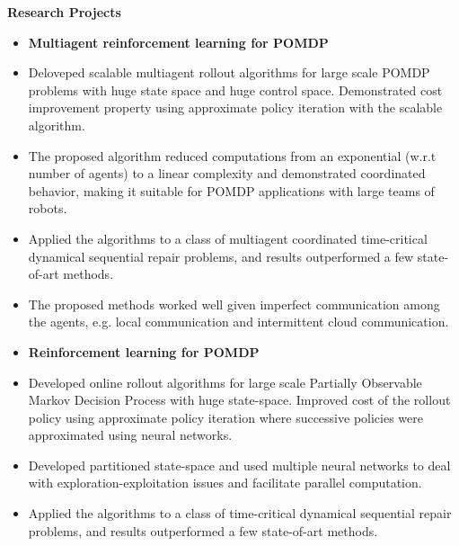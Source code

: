 \documentclass[a4paper,11pt]{article}
\newcommand{\resheading}[1]{{\small \colorbox{mygrey}{\begin{minipage}{0.975\textwidth}{\textbf{#1 \vphantom{p\^{E}}}}\end{minipage}}}}
\begin{document}
	
	
	
	
	
	
	\resheading{\textbf{\large Research Projects}}
	\begin{description}
		\item 
		\begin{itemize}
			\item\textbf{Multiagent reinforcement learning for POMDP}\hfill %
			\item Deloveped scalable multiagent rollout algorithms for large scale POMDP problems with huge state space and huge control space. Demonstrated cost improvement property using approximate policy iteration with the scalable algorithm.
			\item The proposed algorithm reduced computations from an exponential (w.r.t number of agents) to a linear complexity and demonstrated coordinated behavior, making it suitable for POMDP applications with large teams of robots.
			\item Applied the algorithms to a class of multiagent coordinated time-critical dynamical sequential repair problems, and results outperformed a few state-of-art methods.
			\item The proposed methods worked well given imperfect communication among the agents, e.g. local communication and intermittent cloud communication.
		\end{itemize}
		\item 
		\begin{itemize}
			\item\textbf{Reinforcement learning for POMDP}
			\item Developed online rollout algorithms for large scale Partially Observable Markov Decision Process with huge state-space. Improved cost of the rollout policy using approximate policy iteration where successive policies were approximated using neural networks.
			\item Developed partitioned state-space and used multiple neural networks to deal with exploration-exploitation issues and facilitate parallel computation.
			\item Applied the algorithms to a class of time-critical dynamical sequential repair problems, and results outperformed a few state-of-art methods.
			
		\end{itemize}
		
	\end{description}
	
\end{document}
